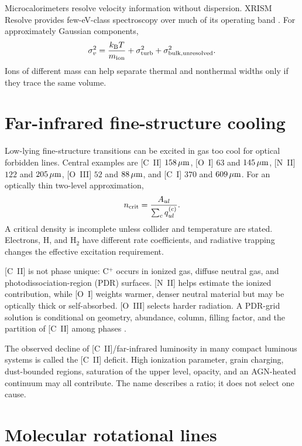 Microcalorimeters resolve velocity information without dispersion. XRISM
Resolve provides few-eV-class spectroscopy over much of its operating band
\citep{XRISMPOG2026}. For approximately Gaussian components,
\begin{equation}
 \sigma_v^2=\frac{k_{\rm B}T}{m_{\rm ion}}+
 \sigma_{\rm turb}^2+\sigma_{\rm bulk,unresolved}^2 .
\end{equation}
Ions of different mass can help separate thermal and nonthermal widths only
if they trace the same volume.

\section{Far-infrared fine-structure cooling}

Low-lying fine-structure transitions can be excited in gas too cool for
optical forbidden lines. Central examples are [C~II] $158\,\mu{\rm m}$,
[O~I] $63$ and $145\,\mu{\rm m}$, [N~II] $122$ and $205\,\mu{\rm m}$,
[O~III] $52$ and $88\,\mu{\rm m}$, and [C~I] $370$ and $609\,\mu{\rm m}$.
For an optically thin two-level approximation,
\begin{equation}
 n_{\rm crit}=\frac{A_{ul}}{\sum_c q_{ul}^{(c)}}.
\end{equation}
A critical density is incomplete unless collider and temperature are stated.
Electrons, H, and H$_2$ have different rate coefficients, and radiative
trapping changes the effective excitation requirement.

[C~II] is not phase unique: C$^+$ occurs in ionized gas, diffuse neutral gas,
and photodissociation-region (PDR) surfaces. [N~II] helps estimate the ionized
contribution, while [O~I] weights warmer, denser neutral material but may be
optically thick or self-absorbed. [O~III] selects harder radiation. A PDR-grid
solution is conditional on geometry, abundance, column, filling factor, and
the partition of [C~II] among phases \citep{TielensHollenbach1985,
HollenbachTielens1999}.

The observed decline of [C~II]/far-infrared luminosity in many compact
luminous systems is called the [C~II] deficit. High ionization parameter,
grain charging, dust-bounded regions, saturation of the upper level, opacity,
and an AGN-heated continuum may all contribute. The name describes a ratio;
it does not select one cause.

\section{Molecular rotational lines}


